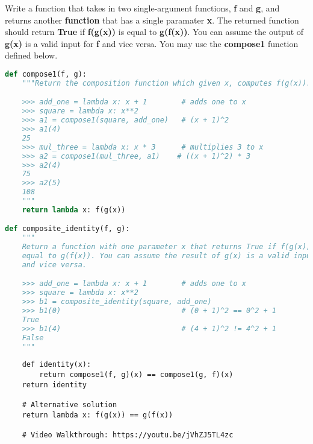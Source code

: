 \question
Write a function that takes in two single-argument functions, \textbf{f} and \textbf{g}, and returns another \textbf{function} that has a single paramater \textbf{x}. The returned function should return \textbf{True} if \textbf{f(g(x))} is equal to \textbf{g(f(x))}. You can assume the output of \textbf{g(x)} is a valid input for \textbf{f} and vice versa. You may use the \textbf{compose1} function defined below.
\begin{lstlisting}[language=Python]
def compose1(f, g):
    """Return the composition function which given x, computes f(g(x)).

    >>> add_one = lambda x: x + 1        # adds one to x
    >>> square = lambda x: x**2
    >>> a1 = compose1(square, add_one)   # (x + 1)^2
    >>> a1(4)
    25
    >>> mul_three = lambda x: x * 3      # multiplies 3 to x
    >>> a2 = compose1(mul_three, a1)    # ((x + 1)^2) * 3
    >>> a2(4)
    75
    >>> a2(5)
    108
    """
    return lambda x: f(g(x))

def composite_identity(f, g):
    """
    Return a function with one parameter x that returns True if f(g(x)) is
    equal to g(f(x)). You can assume the result of g(x) is a valid input for f
    and vice versa.

    >>> add_one = lambda x: x + 1        # adds one to x
    >>> square = lambda x: x**2
    >>> b1 = composite_identity(square, add_one)
    >>> b1(0)                            # (0 + 1)^2 == 0^2 + 1
    True
    >>> b1(4)                            # (4 + 1)^2 != 4^2 + 1
    False
    """
\end{lstlisting}
\begin{solution}[1in]
\begin{lstlisting}
    def identity(x):
        return compose1(f, g)(x) == compose1(g, f)(x)
    return identity

    # Alternative solution
    return lambda x: f(g(x)) == g(f(x))

    # Video Walkthrough: https://youtu.be/jVhZJ5TL4zc
\end{lstlisting}
\end{solution}
